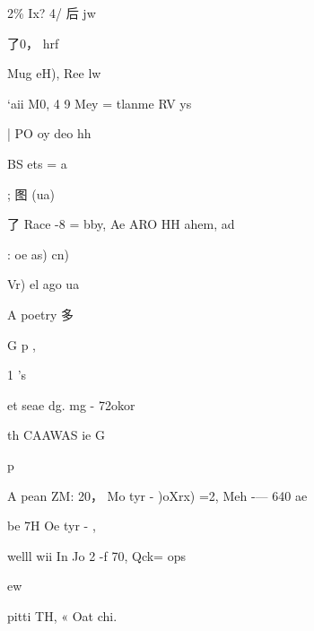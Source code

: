 \documentclass[UTF8,12pt,a4paper,openany]{ctexbook}
\begin{document}
\begin{enumerate}[label=\textbf{\arabic*.},leftmargin=2em]
2\% Ix? 4/ 后 jw\par 了0，  hrf\par Mug      eH), Ree lw\par ‘aii  M0, 4 9 Mey = tlanme   RV ys\par |                                        PO oy deo hh\par BS   ets = a\par ;        图 (ua)\par 了 Race -8 = bby, Ae ARO HH ahem, ad\par :     oe as) cn)\par Vr) el ago ua\par A poetry 多\par G     p      ,\par 1    's\par et seae dg. mg - 72okor\par th CAAWAS ie G\par p\par A pean      ZM: 20， Mo tyr - )oXrx) =2, Meh -— 640 ae\par be 7H Oe tyr -                           ,\par welll wii In              Jo 2 -f 70,  Qck= ops\par ew\par pitti       TH, « Oat chi.\
\end{enumerate}
\end{document}
